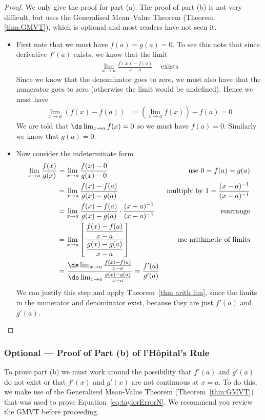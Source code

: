 \begin{proof}
We only give the proof for part (a). The proof of part (b) is not very difficult,
but uses the Generalised Mean--Value Theorem (Theorem \ref{thm:GMVT}), which is
optional and most readers have not seen it.

\begin{itemize}
 \item First note that we must have $f(a)=g(a)=0$. To see this note that since derivative
$f'(a)$ exists, we know that the limit
\begin{align*}
 \lim_{x\to a} \frac{f(x)-f(a)}{x-a} & \text{ exists}
\end{align*}
Since we know that the denominator goes to zero, we must also have that the numerator
goes to zero (otherwise the limit would be undefined). Hence we must have
\begin{align*}
  \lim_{x\to a} (f(x)-f(a)) &=
  \left( \lim_{x\to a} f(x) \right) - f(a) = 0
\end{align*}
We are told that $\ds \lim_{x\to a} f(x) =0$ so we must have $f(a)=0$. Similarly we know
that $g(a)=0$.

\item Now consider the indeterminate form
\begin{align*}
  \lim_{x\to a} \frac{f(x)}{g(x)}
  &= \lim_{x\to a} \frac{f(x) - 0 }{g(x) - 0 }
  & \text{use $0=f(a)=g(a)$}\\
  &= \lim_{x\to a} \frac{f(x) - f(a) }{g(x) - g(a) }
  & \text{multiply by $1=\frac{(x-a)^{-1}}{(x-a)^{-1}}$} \\
  &= \lim_{x\to a} \frac{f(x) - f(a) }{g(x) - g(a) }\cdot\frac{(x-a)^{-1}}{(x-a)^{-1}} &
\text{rearrange} \\
  &= \lim_{x\to a} \left[ \frac{ \dfrac{f(x) - f(a)}{x-a} }{ \dfrac{g(x) - g(a)}{x-a}}
\right] & \text{use arithmetic of limits}\\
  &= \dfrac{\ds \lim_{x\to a} \frac{f(x) - f(a)}{x-a} }
  {\ds \lim_{x\to a} \frac{g(x) - g(a)}{x-a}} = \dfrac{f'(a)}{g'(a)}
\end{align*}
We can justify this step and apply Theorem~\ref{thm arith lim}, since the
limits in the numerator and denominator exist, because they are just $f'(a)$ and $g'(a)$.
\end{itemize}
\end{proof}
\subsubsection*{Optional --- Proof of Part (b) of l'H\^opital's Rule}
To prove part (b) we must work around the possibility that $f'(a)$ and $g'(a)$ do not
exist or that $f'(x)$ and $g'(x)$ are not continuous at $x=a$. To do this, we make use of
the  Generalised Mean-Value Theorem (Theorem~\ref{thm:GMVT}) that was used to prove
Equation~\eqref{eq:taylorErrorN}. We recommend you review the GMVT before proceeding.

